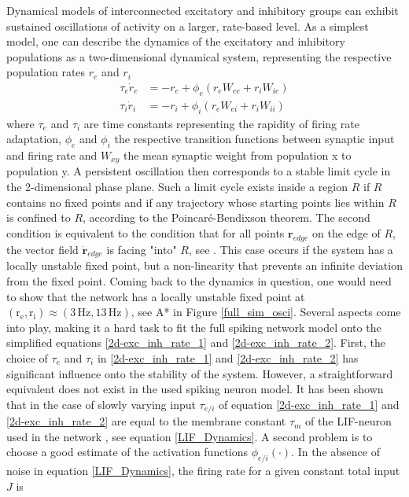\documentclass[10pt,a4paper]{article}
\begin{document}
Dynamical models of interconnected excitatory and inhibitory groups can exhibit sustained oscillations of activity \cite[p.~270]{Theor_Neur_Dayan} on a larger, rate-based level. As a simplest model, one can describe the dynamics of the excitatory and inhibitory populations as a two-dimensional dynamical system, representing the respective population rates $r_e$ and $r_i$
\begin{align}
\tau_e \dot{r}_e  &= -r_e + \phi_e(r_e W_{ee} + r_i W_{ie}) \label{2d-exc_inh_rate_1} \\
\tau_i \dot{r}_i  &= -r_i + \phi_i(r_e W_{ei} + r_i W_{ii}) \label{2d-exc_inh_rate_2}
\end{align}
where $\tau_e$ and $\tau_i$ are time constants representing the rapidity of firing rate adaptation, $\phi_e$ and $\phi_i$ the respective transition functions between synaptic input and firing rate and $W_{xy}$ the mean synaptic weight from population x to population y. A persistent oscillation then corresponds to a stable limit cycle in the 2-dimensional phase plane. Such a limit cycle exists inside a region $R$ if $R$ contains no fixed points and if any trajectory whose starting points lies within $R$ is confined to $R$, according to the Poincaré-Bendixson theorem. The second condition is equivalent to the condition that for all points $\mathbf{r}_{edge}$ on the edge of $R$, the vector field $\dot{\mathbf{r}}_{edge}$ is facing "into" $R$, see \cite[p.~248]{Dyn_Sys_Hirsch}. This case occurs if the system has a locally unstable fixed point, but a non-linearity that prevents an infinite deviation from the fixed point.
Coming back to the dynamics in question, one would need to show that the network has a locally unstable fixed point at $\mathrm{(r_e,r_i)\approx (3\, Hz, 13\, Hz)}$, see A* in Figure \ref{full_sim_osci}. Several aspects come into play, making it a hard task to fit the full spiking network model onto the simplified equations \ref{2d-exc_inh_rate_1} and \ref{2d-exc_inh_rate_2}. First, the choice of $\tau_e$ and $\tau_i$ in \ref{2d-exc_inh_rate_1} and \ref{2d-exc_inh_rate_2} has significant influence onto the stability of the system. However, a straightforward equivalent does not exist in the used spiking neuron model. It has been shown that in the case of slowly varying input $\tau_{e/i}$ of equation \ref{2d-exc_inh_rate_1} and \ref{2d-exc_inh_rate_2} are equal to the membrane constant $\tau_m$ of the LIF-neuron used in the network \cite{Gerstner_Pop_Act}, see equation \ref{LIF_Dynamics}. A second problem is to choose a good estimate of the activation functions $\phi_{e/i}( \cdot )$. In the absence of noise in equation \ref{LIF_Dynamics}, the firing rate for a given constant total input $J$ is
\end{document}
